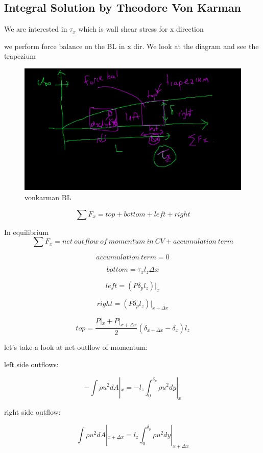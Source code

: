 \documentclass[11pt]{article}
\begin{document}
\subsection{Integral Solution by Theodore Von Karman}

We are interested in $\tau_x$ which is wall shear stress for x direction

we perform force balance on the BL in x dir. We look at the diagram and see the trapezium


\begin{figure}[H]
\centering

\includegraphics[width=\textwidth]{vonkarman BL.png}
\caption{vonkarman BL}
\label{H and Pb scattering}

\end{figure}

$$\sum F_x = top + bottom + left + right $$


In equilibrium
$$\sum F_x = net \ outflow \ of \ momentum \ in \ CV + accumulation\ term$$

$$accumulation\ term = 0 $$


$$bottom =  \tau_x l_z \Delta x$$

$$left = (P \delta_p l_z)|_x$$

$$right = (P \delta_p l_z)|_{x+\Delta x}$$

$$top = \frac{P|_x + P|_{x+\Delta x}}{2} (\delta_{x+\Delta x} - \delta_{x}) l_z $$


let's take a look at net outflow of momentum:

left side outflows:

$$-\int \rho u^2 dA |_{x} = - l_z \int_0^{\delta_p} \rho u^2 dy |_x$$

right side outflow:

$$\int \rho u^2 dA |_{x+\Delta x} =  l_z \int_0^{\delta_p} \rho u^2 dy |_{x+\Delta x} $$
\end{document}
